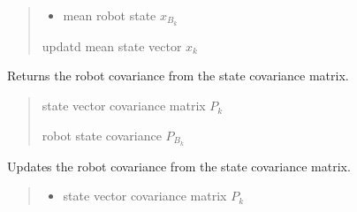 \documentclass[letterpaper,10pt,english]{sphinxmanual}
\begin{document}
\begin{fulllineitems}
\begin{fulllineitems}
\begin{quote}
\begin{description}
\begin{itemize}
\item {} 
\sphinxAtStartPar
{} \textendash{} mean robot state \(x_{B_k}\)

\end{itemize}

\sphinxAtStartPar
updatd mean  state vector \(x_{k}\)

\end{description}\end{quote}

\end{fulllineitems}


\begin{fulllineitems}
\label{\detokenize{FEKFMBLocalization:FEKFMBL.FEKFMBL.GetRobotStateCovariance}}
\pysigstartsignatures
{}
\pysigstopsignatures
\sphinxAtStartPar
Returns the robot covariance from the state covariance matrix.
\begin{quote}\begin{description}
\sphinxAtStartPar
{} \textendash{} state vector covariance matrix \(P_k\)

\sphinxAtStartPar
robot state covariance \(P_{B_k}\)

\end{description}\end{quote}

\end{fulllineitems}


\begin{fulllineitems}
\label{\detokenize{FEKFMBLocalization:FEKFMBL.FEKFMBL.SetRobotStateCovariance}}
\pysigstartsignatures
{}
\pysigstopsignatures
\sphinxAtStartPar
Updates the robot covariance from the state covariance matrix.
\begin{quote}\begin{description}
\begin{itemize}
\item {} 
\sphinxAtStartPar
{} \textendash{} state vector covariance matrix \(P_k\)


\end{itemize}
\end{description}
\end{quote}
\end{fulllineitems}
\end{fulllineitems}
\end{document}
